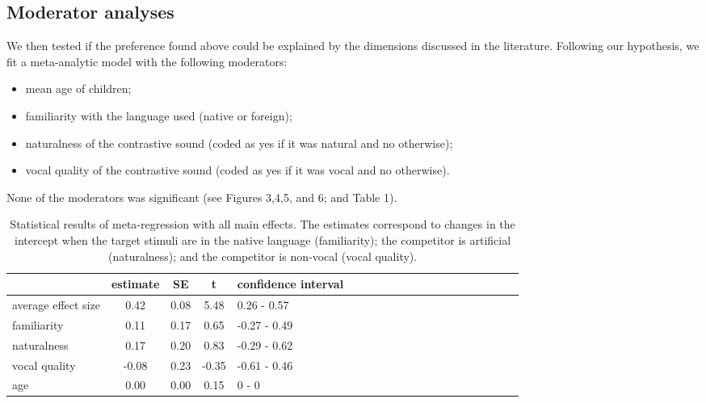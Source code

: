 \documentclass[man]{apa6}
\providecommand{\tightlist}{%
  \setlength{\itemsep}{0pt}\setlength{\parskip}{0pt}}
\begin{document}
\subsection{Moderator analyses}\label{moderator-analyses}

We then tested if the preference found above could be explained by the
dimensions discussed in the literature. Following our hypothesis, we fit
a meta-analytic model with the following moderators:

\begin{itemize}
\tightlist
\item
  mean age of children;
\item
  familiarity with the language used (native or foreign);
\item
  naturalness of the contrastive sound (coded as yes if it was natural
  and no otherwise);
\item
  vocal quality of the contrastive sound (coded as yes if it was vocal
  and no otherwise).
\end{itemize}

None of the moderators was significant (see Figures 3,4,5, and 6; and
Table 1).

\begin{table}[tbp]
\begin{center}
\begin{threeparttable}
\caption{\label{tab:Table1}Statistical results of meta-regression with all main effects. The estimates correspond to changes in the intercept when the target stimuli are in the native language (familiarity); the competitor is artificial (naturalness); and the competitor is non-vocal (vocal quality).}
\begin{tabular}{lccclccclccclccclccc}
\toprule
 & estimate & SE & t & confidence interval\\
\midrule
average effect size & 0.42 & 0.08 & 5.48 & 0.26 - 0.57\\
familiarity & 0.11 & 0.17 & 0.65 & -0.27 - 0.49\\
naturalness & 0.17 & 0.20 & 0.83 & -0.29 - 0.62\\
vocal quality & -0.08 & 0.23 & -0.35 & -0.61 - 0.46\\
age & 0.00 & 0.00 & 0.15 & 0 - 0\\
\bottomrule
\end{tabular}
\end{threeparttable}
\end{center}
\end{table}
\end{document}
